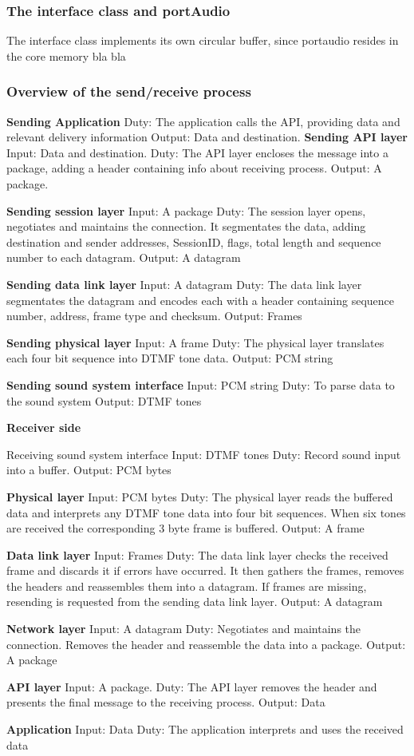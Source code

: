 \subsubsection{The interface class and portAudio}
The interface class implements its own circular buffer, since portaudio resides in the core memory bla bla


\subsubsection{Overview of the send/receive process}

\textbf{Sending Application}
Duty: The application calls the API, providing data and relevant delivery information
Output: Data and destination.
\textbf{
Sending API layer}
Input: Data and destination.
Duty: The API layer encloses the message into a package, adding a header containing info about receiving process.
Output: A package.

\textbf{Sending session layer}
Input: A package
Duty: The session layer opens, negotiates and maintains the connection. It segmentates the data, adding destination and sender addresses, SessionID, flags, total length and sequence number to each datagram.
Output: A datagram

\textbf{Sending data link layer}
Input: A datagram
Duty: The data link layer segmentates the datagram and encodes each with a header containing sequence number, address, frame type and checksum.
Output: Frames

\textbf{Sending physical layer}
Input: A frame
Duty: The physical layer translates each four bit sequence into DTMF tone data.
Output: PCM string

\textbf{Sending sound system interface}
Input: PCM string
Duty: To parse data to the sound system
Output: DTMF tones


\textbf{Receiver side}

Receiving sound system interface
Input: DTMF tones
Duty: Record sound input into a buffer.
Output: PCM bytes

\textbf{Physical layer}
Input: PCM bytes
Duty: The physical layer reads the buffered data and interprets any DTMF tone data into four bit sequences. When six tones are received the corresponding 3 byte frame is buffered.
Output: A frame

\textbf{Data link layer}
Input: Frames
Duty: The data link layer checks the received frame and discards it if errors have occurred. It then gathers the frames, removes the headers and reassembles them into a datagram. If frames are missing, resending is requested from the sending data link layer.
Output: A datagram

\textbf{Network layer}
Input: A datagram
Duty: Negotiates and maintains the connection. Removes the header and reassemble the data into a package.
Output: A package

\textbf{API layer}
Input: A package.
Duty: The API layer removes the header and presents the final message to the receiving process.
Output: Data

\textbf{Application}
Input: Data
Duty: The application interprets and uses the received data
